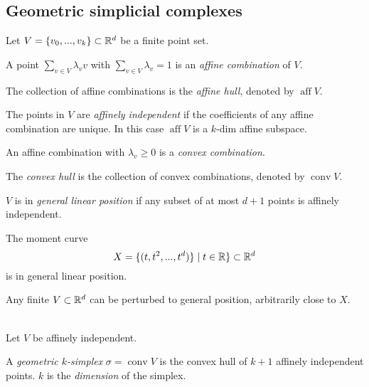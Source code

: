 \begin{multicols*}{3}
\section{Geometric simplicial complexes}
Let $V=\{v_0,...,v_k\}\subset \mathbb{R}^d$ be a finite point set. \vspace{-0.5pc}
\begin{definition}
 A point $\sum_{v\in V} \lambda_v v$ with $\sum_{v\in V}\lambda_v =1$ is an \emph{affine combination} of $V$.
\end{definition}
\rspace
\begin{defi}
The collection of affine combinations is the \emph{affine hull}, denoted by $\operatorname{aff} V$.
\end{defi}
\rspace
\begin{defi}The points in $V$ are \emph{affinely independent} if the coefficients of any affine combination are unique. In this case  $\operatorname{aff} V$ is a $k$-dim affine subspace.
\end{defi}
\rspace
\begin{definition} 
An affine combination with $\lambda_v \geq 0 $ is a \emph{convex combination}. 
\end{definition}
\rspace
\begin{defi}
The \emph{convex hull} is the collection of convex combinations, denoted by $\operatorname{conv} V$.
\end{defi}
\rspace
\drawaline
\vspace{-1.5pc}
\begin{definition}
$V$ is in \emph{general linear position} if any subset of at most $d+1$ points is affinely independent.
\end{definition}
\rspace
\begin{example}
The moment curve $$X = \{(t,t^2,...,t^d)\} \mid t \in \mathbb{R}\} \subset \mathbb{R}^d$$ is in general linear position.
\end{example}
\rspace
\begin{rem}
Any finite $V\subset \mathbb{R}^d$ can be perturbed to general position, arbitrarily close to $X$.
\end{rem}
\rspace
\drawaline\\
Let $V$ be affinely independent. \vspace{-0.5pc}
\begin{defi}
A \emph{geometric $k$-simplex} $\sigma = \operatorname{conv} V$ is the convex hull of $k+1$ affinely independent points. $k$ is the \emph{dimension} of the simplex.

\end{defi}
\end{multicols*}
